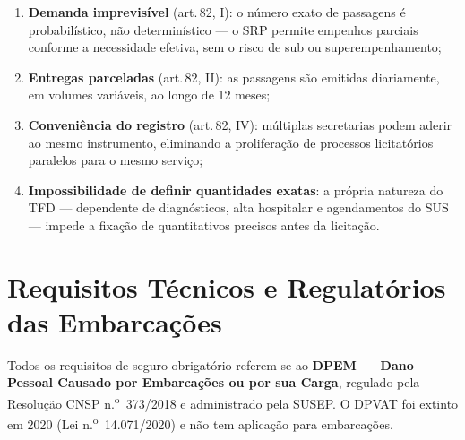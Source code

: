 \documentclass[12pt,a4paper]{article}
\newcommand{\art}[1]{art.\,#1}
\begin{document}
\begin{enumerate}
  \item \textbf{Demanda imprevisível} (\art{82}, I): o número exato de
    passagens é probabilístico, não determinístico --- o SRP permite empenhos
    parciais conforme a necessidade efetiva, sem o risco de sub ou
    superempenhamento;

  \item \textbf{Entregas parceladas} (\art{82}, II): as passagens são emitidas
    diariamente, em volumes variáveis, ao longo de 12 meses;

  \item \textbf{Conveniência do registro} (\art{82}, IV): múltiplas secretarias
    podem aderir ao mesmo instrumento, eliminando a proliferação de processos
    licitatórios paralelos para o mesmo serviço;

  \item \textbf{Impossibilidade de definir quantidades exatas}: a própria
    natureza do TFD --- dependente de diagnósticos, alta hospitalar e
    agendamentos do SUS --- impede a fixação de quantitativos precisos
    antes da licitação.
\end{enumerate}

\section{Requisitos Técnicos e Regulatórios das Embarcações}

\begin{corrbox}
\small
Todos os requisitos de seguro obrigatório referem-se ao
\textbf{DPEM --- Dano Pessoal Causado por Embarcações ou por sua Carga},
regulado pela Resolução CNSP n.\textsuperscript{o}~373/2018 e administrado
pela SUSEP. O DPVAT foi extinto em 2020 (Lei n.\textsuperscript{o}~14.071/2020)
e não tem aplicação para embarcações.
\end{corrbox}
\end{document}
